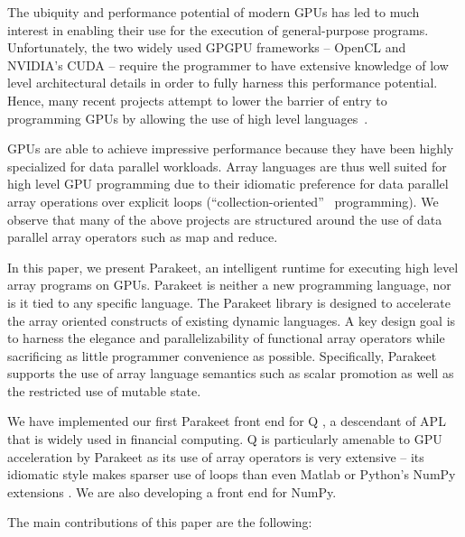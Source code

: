 \documentclass[preprint]{sigplanconf}
\begin{document}
The ubiquity and performance potential of modern GPUs has led to much interest in enabling their use for the execution of general-purpose programs. Unfortunately, the two widely used GPGPU frameworks -- OpenCL \cite{Muns10} and NVIDIA's CUDA \cite{NvidCU} -- require the programmer to have extensive knowledge of low level architectural details in order to fully harness this performance potential. Hence, many recent projects attempt to lower the barrier of entry to programming GPUs by allowing the use of high level languages~\cite{Cata11,Chaf11,Chak11,Main10,Sven08,Tard06}.

GPUs are able to achieve impressive performance because they have been highly specialized for data parallel workloads.  Array languages are thus well suited for high level GPU programming due to their idiomatic preference for data parallel array operations over explicit loops (``collection-oriented''~\cite{Sip91} programming). We observe that many of the above projects are structured around the use of data parallel array operators such as map and reduce.

In this paper, we present Parakeet, an intelligent runtime for executing high level array programs on GPUs. Parakeet is neither a new programming language, nor is it tied to any specific language. The Parakeet library is designed to accelerate the array oriented constructs of existing dynamic languages. A key design goal is to harness the elegance and parallelizability of functional array operators while sacrificing as little programmer convenience as possible.  Specifically, Parakeet supports the use of array language semantics such as scalar promotion as well as the restricted use of mutable state.

We have implemented our first Parakeet front end for Q \cite{Borr08}, a descendant of APL that is widely used in financial computing. Q is particularly amenable to GPU acceleration by Parakeet as its use of array operators is very extensive -- its idiomatic style makes sparser use of loops than even Matlab \cite{Moler80} or Python's NumPy extensions \cite{dubo96}. We are also developing a front end for NumPy.

The main contributions of this paper are the following:
\end{document}
